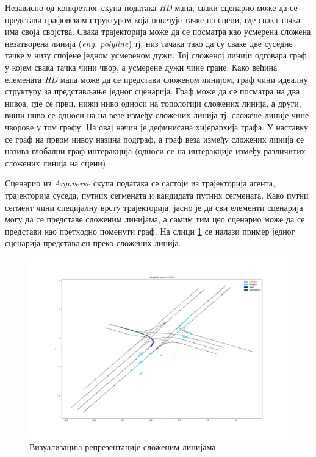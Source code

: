 \documentclass[11pt,oneside]{memoir}
\begin{document}
Независно од конкретног скупа података \textit{HD} мапа, сваки сценарио може да се представи графовском структуром која повезује тачке на сцени, где
свака тачка има своја својства. Свака трајекторија може да се посматра као усмерена сложена незатворена линија (\textit{eng. polyline}) тј. 
низ тачака тако да су сваке две суседне тачке у низу спојене једном усмереном дужи. Тој сложеној линији одговара граф у којем свака тачка
чини чвор, а усмерене дужи чине гране. Како већина елемената \textit{HD} мапа може да се представи сложеном линијом, граф чини идеалну структуру
за представљање једног сценарија. Граф може да се посматра на два нивоа, где се први, нижи ниво односи на топологији сложених линија, а други, виши ниво 
се односи на на везе између сложених линија тј. сложене линије чине чворове у том графу. На овај начин је дефинисана хијерархија графа. 
У наставку се граф на првом нивоу назина подграф, а граф веза између сложених линија се назива глобални граф интеракција (односи се на интеракције
између различитих сложених линија на сцени).

Сценарио из \textit{Argoverse} скупа података се састоји из трајекторија агента, трајекторија суседа, путних сегмената и кандидата путних сегмената.
Како путни сегмент чини специјалну врсту трајекторија, јасно је да сви елементи сценарија могу да се представе сложеним линијама, а самим тим
цео сценарио може да се представи као претходно поменути граф. На слици \ref{polylines-representation} се налази пример једног сценарија
представљен преко сложених линија.

\begin{figure}[H]
  \includegraphics[width=1.0\textwidth]{images/polylines-representation.png}
  \caption{Визуализација репрезентације сложеним линијама}
  \label{polylines-representation}
\end{figure}
\end{document}
